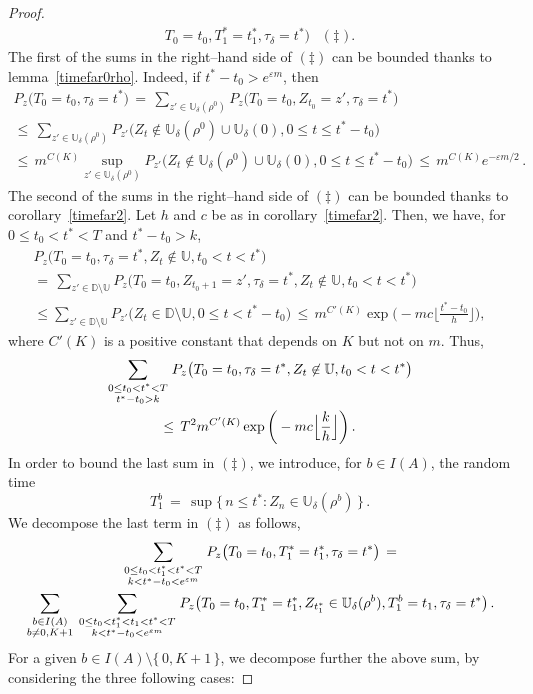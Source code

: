 \documentclass[a4paper,12pt]{article}
\theoremstyle{definition}
\theoremstyle{remark}
\def \d {\delta}
\def \e {\varepsilon}
\def \dD {\mathbb{D}}
\def \dU {\mathbb{U}}
\begin{document}
\begin{proof}
\begin{multline*}
T_0=t_0,T_1^*=t_1^*,\tau_\d=t^*
\big)\quad\big(\ddag\big)\,.
\end{multline*}
The first of the sums in the right--hand side of $(\ddag)$ can be bounded thanks to lemma~\ref{timefar0rho}.
Indeed, if $t^*-t_0>e^{\e m}$,
then
\begin{multline*}
P_z\big(
T_0=t_0,\tau_\d=t^*
\big)\,
=\,\sum_{z'\in\dU_\d(\rho^0)}P_z\big(
T_0=t_0,Z_{t_0}=z',\tau_\d=t^*
\big)\\
\leq\,\sum_{z'\in\dU_\d(\rho^0)}P_{z'}\big(
Z_t\not\in\dU_\d(\rho^0)\cup\dU_\d(0),0\leq t\leq t^*-t_0
\big)\\
\leq\,
m^{C(K)}\sup_{z'\in\dU_\d(\rho^0)}P_{z'}\big(
Z_t\not\in\dU_\d(\rho^0)\cup\dU_\d(0),0\leq t\leq t^*-t_0
\big)\,\leq\,m^{C(K)}e^{-\e m/2}\,.
\end{multline*}
The second of the sums in the right--hand side of $(\ddag)$ can be bounded thanks to corollary~\ref{timefar2}.
Let $h$ and $c$ be as in corollary~\ref{timefar2}.
Then, we have, for $0\leq t_0<t^*<T$ and $t^*-t_0>k$,
\begin{multline*}
P_z\big(
T_0=t_0,\tau_\d=t^*,Z_t\not\in\dU, t_0<t<t^*
\big)\\
=\,\sum_{z'\in\dD\setminus\dU}P_z\big(
T_0=t_0,Z_{t_0+1}=z',\tau_\d=t^*,Z_t\not\in\dU, t_0<t<t^*
\big)\\
\leq\!\sum_{z'\in\dD\setminus\dU}P_{z'}\big(
Z_t\in\dD\setminus\dU,0\leq t<t^*-t_0
\big)\,
\leq\,
m^{C'(K)}\exp\bigg(
-m c\Big\lfloor
\frac{t^*-t_0}{h}
\Big\rfloor
\bigg),
\end{multline*}
where $C'(K)$ is a positive constant that depends on $K$ but not on $m$.
Thus,
\begin{multline*}
\sum_{\genfrac{}{}{0pt}{1}{0\leq t_0<t^*<T}{t^*-t_0>k}}P_z\big(
T_0=t_0,\tau_\d=t^*, Z_t\not\in\dU,t_0<t<t^*
\big)\\\leq\,T^2m^{C'(K)}\exp\bigg(
-m c\Big\lfloor
\frac{k}{h}
\Big\rfloor
\bigg)\,.
\end{multline*}
In order to bound the last sum in $(\ddag)$,
we introduce, for $b\in I(A)$,
the random time 
$$T^b_1\,=\,\sup\big\lbrace\,
n\leq t^*:Z_n\in\dU_\d(\rho^b)
\,\big\rbrace\,.$$
We decompose the last term in $(\ddag)$ as follows,
\begin{multline*}
\sum_{\genfrac{}{}{0pt}{1}{0\leq t_0<t_1^*<t^*<T}{k<t^*-t_0<e^{\e m}}}
P_z\big(
T_0=t_0,T_1^*=t_1^*,\tau_\d=t^*
\big)\,=\\
\sum_{\genfrac{}{}{0pt}{1}{b\in I(A)}{b\neq 0,K+1}}
\sum_{\genfrac{}{}{0pt}{1}{0\leq t_0<t_1^*<t_1<t^*<T}{k<t^*-t_0<e^{\e m}}}
P_z\big(
T_0=t_0,T_1^*=t_1^*,
Z_{t_1^*}\in\dU_\d(\rho^b),T_1^b=t_1,\tau_\d=t^*
\big)\,.
\end{multline*}
For a given $b\in I(A)\setminus\lbrace\,0,K+1\,\rbrace$,
we decompose further the above sum, by considering the three following cases:


\end{proof}
\end{document}
